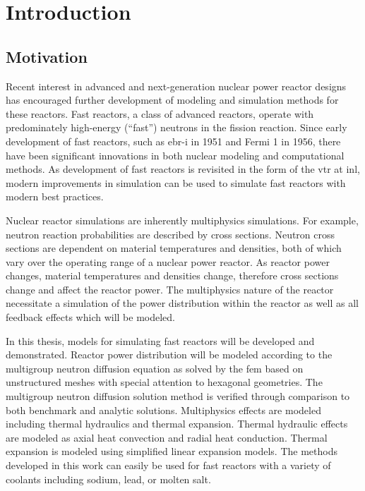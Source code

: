 \chapter{Introduction}
\label{ch:introduction}

\section{Motivation}
  Recent interest in advanced and next-generation nuclear power reactor designs
  has encouraged further development of modeling and simulation methods for
  these reactors. Fast reactors, a class of advanced reactors, operate with
  predominately high-energy (``fast'') neutrons in the fission reaction. Since
  early development of fast reactors, such as  \gls{ebr-i} in 1951 and Fermi 1
  in 1956, there have been significant innovations in both nuclear modeling and
  computational methods. As development of fast reactors is revisited in the
  form of the \gls{vtr} at \gls{inl}, modern improvements in simulation can be
  used to simulate fast reactors with modern best practices. 
  

  Nuclear reactor simulations are inherently multiphysics simulations. For
  example, neutron reaction probabilities are described by cross sections.
  Neutron cross sections are dependent on material temperatures and densities,
  both of which vary over the operating range of a nuclear power reactor. As
  reactor power changes, material temperatures and densities change, therefore
  cross sections change and affect the reactor power. The multiphysics nature
  of the reactor necessitate a simulation of the power distribution within the
  reactor as well as all feedback effects which will be modeled. 
  
  In this thesis, models for simulating fast reactors will be developed and
  demonstrated. Reactor power distribution will be modeled according to the
  multigroup neutron diffusion equation as solved by the \gls{fem} based on
  unstructured meshes with special attention to hexagonal geometries.
  The multigroup neutron diffusion solution method is verified through
  comparison to both benchmark and analytic solutions. Multiphysics effects are
  modeled including thermal hydraulics and thermal expansion. Thermal hydraulic
  effects are modeled as axial heat convection and radial heat conduction.
  Thermal expansion is modeled using simplified linear expansion models. The
  methods developed in this work can easily be used for fast reactors with a
  variety of coolants including sodium, lead, or molten salt.


